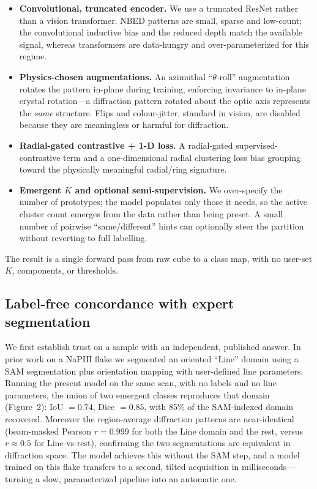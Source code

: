\documentclass[journal=ancac3,manuscript=article,layout=twocolumn]{achemso}
\begin{document}
\begin{itemize}
\item \textbf{Convolutional, truncated encoder.} We use a truncated ResNet
rather than a vision transformer. NBED patterns are small, sparse and
low-count; the convolutional inductive bias and the reduced depth match the
available signal, whereas transformers are data-hungry and over-parameterized
for this regime.
\item \textbf{Physics-chosen augmentations.} An azimuthal ``$\theta$-roll''
augmentation rotates the pattern in-plane during training, enforcing
invariance to in-plane crystal rotation---a diffraction pattern rotated about
the optic axis represents the \emph{same} structure. Flips and colour-jitter,
standard in vision, are disabled because they are meaningless or harmful for
diffraction.
\item \textbf{Radial-gated contrastive + 1-D loss.} A radial-gated
supervised-contrastive term\cite{khosla2020} and a one-dimensional radial
clustering loss bias grouping toward the physically meaningful radial/ring
signature.
\item \textbf{Emergent $K$ and optional semi-supervision.} We over-specify the
number of prototypes; the model populates only those it needs, so the active
cluster count emerges from the data rather than being preset. A small number
of pairwise ``same/different'' hints can optionally steer the partition
without reverting to full labelling.
\end{itemize}
The result is a single forward pass from raw cube to a class map, with no
user-set $K$, components, or thresholds.

\subsection{Label-free concordance with expert segmentation}
We first establish trust on a sample with an independent, published answer. In
prior work on a NaPHI flake we segmented an oriented ``Line'' domain using a
SAM segmentation plus orientation mapping with user-defined line
parameters.\cite{ourNaPHI} Running the present model on the same scan, with no
labels and no line parameters, the union of two emergent classes reproduces
that domain (Figure~2): IoU $=0.74$, Dice $=0.85$, with $85\%$ of the
SAM-indexed domain recovered. Moreover the region-average diffraction patterns
are near-identical (beam-masked Pearson $r=0.999$ for both the Line domain and
the rest, versus $r\approx0.5$ for Line-vs-rest), confirming the two
segmentations are equivalent in diffraction space. The model achieves this without the
SAM step, and a model trained on this flake transfers to a second, tilted
acquisition in milliseconds---turning a slow, parameterized pipeline into an
automatic one.
\end{document}
